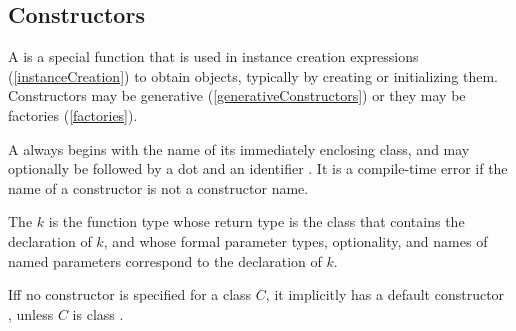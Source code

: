 \documentclass[makeidx]{article}
\begin{document}
\subsection{Constructors}

\LMHash{}%
A  is a special function that is used in instance creation expressions (\ref{instanceCreation}) to obtain objects, typically by creating or initializing them.
Constructors may be generative (\ref{generativeConstructors}) or they may be factories (\ref{factories}).

\LMHash{}%
A  always begins with the name of its immediately enclosing class, and may optionally be followed by a dot and an identifier \id.
It is a compile-time error if the name of a constructor is not a constructor name.

\LMHash{}%
The  $k$ is the function type whose
return type is the class that contains the declaration of $k$,
and whose formal parameter types, optionality, and names of named parameters
correspond to the declaration of $k$.





\LMHash{}%
If{}f no constructor is specified for a class $C$, it implicitly has a default constructor , unless $C$ is class .
\end{document}
